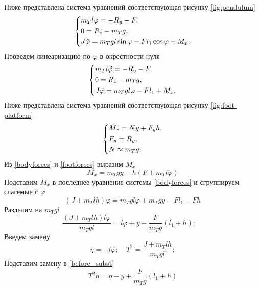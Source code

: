 \documentclass[a4paper,12pt, openany]{book}
\theoremstyle{plain} %
\theoremstyle{definition} %
\theoremstyle{remark} %
\numberwithin{equation}{chapter}
\begin{document}
{Ниже представлена система уравнений соответствующая рисунку \ref{fig:pendulum}
\begin{equation}\label{bodyforces}
    \left\{ {\begin{aligned}
                 & m_Tl\ddot{\varphi} = -R_y-F , \hfill                             \\
                 & 0=R_z-m_Tg, \hfill                                              \\
                 & J \ddot{\varphi} = m_Tgl\sin \varphi-Fl_1\cos \varphi+M_x . \hfill \\
            \end{aligned}} \right.
\end{equation}
Проведем линеаризацию по $\varphi$ в окрестности нуля
\begin{equation}\label{bodyforces}
    \left\{ {\begin{aligned}
                 & m_Tl\ddot{\varphi} = -R_y-F , \hfill             \\
                 & 0=R_z-m_Tg, \hfill                              \\
                 & J \ddot{\varphi} = m_Tgl\varphi-Fl_1+M_x . \hfill \\
            \end{aligned}} \right.
\end{equation}
Ниже представлена система уравнений соответствующая рисунку \ref{fig:foot-platform}
\begin{equation}\label{footforces}
    \left\{ {\begin{aligned}
                 & M_x = Ny+F_yh , \hfill \\
                 & F_y = R_y , \hfill     \\
                 & N \approx m_Tg . \hfill  \\
            \end{aligned}} \right.
\end{equation}
Из \eqref{bodyforces} и \eqref{footforces} выразим $M_x$
$$M_x=m_Tgy-h\left(F+m_Tl\ddot{\varphi}\right)$$
Подставим $M_x$ в последнее уравнение системы \eqref{bodyforces} и сгруппируем слагемые с $\ddot{\varphi}$
$$\left(J+m_Tlh\right)\ddot{\varphi}=m_Tgl\varphi+m_Tgy-Fl_1-Fh$$
Разделим на $m_Tgl$
\begin{equation}\label{before_subst}
    \frac{(J+m_Tlh)l\ddot{\varphi}}{m_Tgl}=l\varphi+y-\frac{F}{m_Tg}(l_1+h);\quad
\end{equation}
Введем замену
$$\eta=-l\varphi; \quad T^2=\frac{J+m_Tlh}{m_Tgl};$$
Подставим замену в \eqref{before_subst}
\[
    T^2\ddot{\eta}=\eta-y+\frac{F}{m_Tg}(l_1+h)
\]

}
\end{document}
